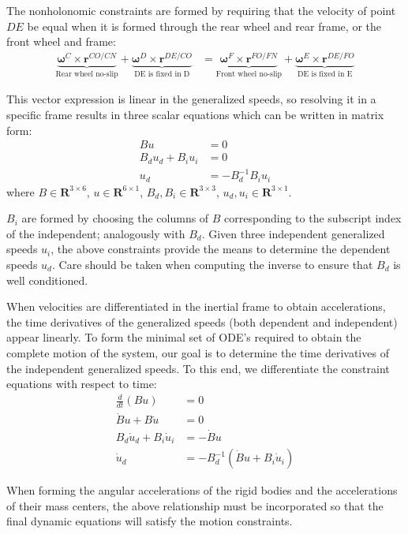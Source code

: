\documentclass[letterpaper,11pt]{article}
\newcommand{\bs}[1]{ \boldsymbol{ #1 } }
\begin{document}
The nonholonomic constraints are formed by requiring that the velocity of point
$DE$ be equal when it is formed through the rear wheel and rear frame, or the
front wheel and frame:
\begin{align*}
  \underbrace{\bs{\omega}^C \times \bs{r}^{CO/CN}}_{\text{Rear wheel no-slip}}
  +
  \underbrace{\bs{\omega}^D \times \bs{r}^{DE/CO}}_{\text{DE is fixed in D}}
  & =
  \underbrace{\bs{\omega}^F \times \bs{r}^{FO/FN}}_{\text{Front wheel no-slip}}
  +
  \underbrace{\bs{\omega}^E \times \bs{r}^{DE/FO}}_{\text{DE is fixed in E}}
\end{align*}

This vector expression is linear in the generalized speeds, so resolving it in
a specific frame results in three scalar equations which can be written in
matrix form:
\begin{align*}
  B u & = 0 \\
  B_d u_d + B_i u_i & = 0 \\
  u_d & = -B_d^{-1} B_i u_i
\end{align*}
where $B \in \mathbf{R}^{3 \times 6}$, $u \in \mathbf{R}^{6 \times 1}$, $B_d, B_i \in
\mathbf{R}^{3 \times 3}$, $u_d, u_i \in \mathbf{R}^{3 \times 1}$.

$B_i$ are formed by choosing the columns of $B$ corresponding to the subscript
index of the independent; analogously with $B_d$.  Given three independent
generalized speeds $u_i$, the above constraints provide the means to determine
the dependent speeds $u_d$.  Care should be taken when computing the inverse to
ensure that $B_d$ is well conditioned.

When velocities are differentiated in the inertial frame to obtain
accelerations, the time derivatives of the generalized speeds (both dependent
and independent) appear linearly.  To form the minimal set of ODE's required to obtain
the complete motion of the system, our goal is to determine the time
derivatives of the independent generalized speeds.  To this end, we
differentiate the constraint equations with respect to time:
\begin{align*}
  \frac{d}{dt}\left(B u\right) & = 0 \\
  \dot{B} u + B \dot{u} & = 0 \\
  B_d \dot{u}_d + B_i \dot{u}_i & = -\dot{B} u \\
  \dot{u}_d & = -B_d^{-1} \left(\dot{B} u  + B_i \dot{u}_i \right)
\end{align*}

When forming the angular accelerations of the rigid bodies and the
accelerations of their mass centers, the above relationship must be
incorporated so that the final dynamic equations will satisfy the motion
constraints.
\end{document}
